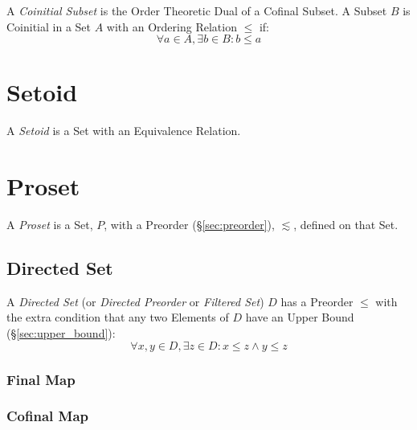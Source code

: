 A \emph{Coinitial Subset} is the Order Theoretic Dual of a Cofinal
Subset. A Subset $B$ is Coinitial in a Set $A$ with an Ordering
Relation $\leq$ if:
\[
  \forall a \in A, \exists b \in B : b \leq a
\]



\section{Setoid}\label{sec:setoid}

A \emph{Setoid} is a Set with an Equivalence Relation.



\section{Proset}\label{sec:proset}

A \emph{Proset} is a Set, $P$, with a Preorder
(\S\ref{sec:preorder}), $\lesssim$, defined on that Set.



\subsection{Directed Set}\label{sec:directed_set}

A \emph{Directed Set} (or \emph{Directed Preorder} or \emph{Filtered
  Set}) $D$ has a Preorder $\leq$ with the extra condition that any
two Elements of $D$ have an Upper Bound (\S\ref{sec:upper_bound}):
\[
  \forall x, y \in D, \exists z \in D : x \leq z \wedge y \leq z
\]



\subsubsection{Final Map}\label{sec:final_map}

\subsubsection{Cofinal Map}\label{sec:cofinal_map}



